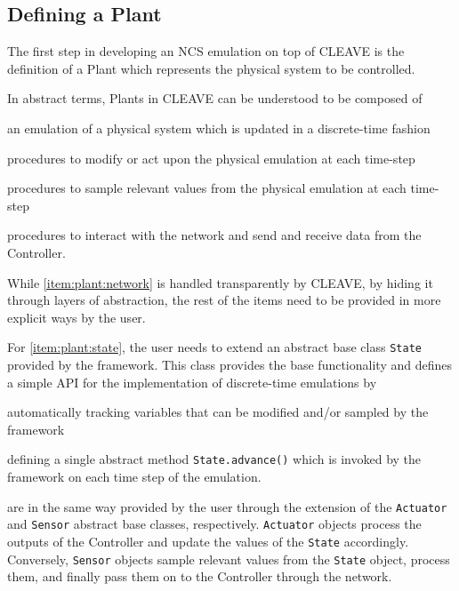 \subsection{Defining a Plant}

The first step in developing an \ac{NCS} emulation on top of \ac{CLEAVE} is the definition of a Plant which represents the physical system to be controlled.

In abstract terms, Plants in \ac{CLEAVE} can be understood to be composed of
\begin{enumerate*}[itemjoin={{; }}, itemjoin*={{; and }}]
    \item\label{item:plant:state} an emulation of a physical system which is updated in a discrete-time fashion
    \item\label{item:plant:actuators} procedures to modify or act upon the physical emulation at each time-step
    \item\label{item:plant:sensors} procedures to sample relevant values from the physical emulation at each time-step
    \item\label{item:plant:network} procedures to interact with the network and send and receive data from the Controller.
\end{enumerate*}

While \cref{item:plant:network} is handled transparently by CLEAVE, by hiding it through layers of abstraction, the rest of the items need to be provided in more explicit ways by the user.

For \cref{item:plant:state}, the user needs to extend an abstract base class \texttt{State} provided by the framework.
This class provides the base functionality and defines a simple API for the implementation of discrete-time emulations by
\begin{enumerate*}[itemjoin={{; }}, itemjoin*={{; and }}]
    \item automatically tracking variables that can be modified and/or sampled by the framework
    \item defining a single abstract method \texttt{State.advance()} which is invoked by the framework on each time step of the emulation.
\end{enumerate*}

 are in the same way provided by the user through the extension of the \texttt{Actuator} and \texttt{Sensor} abstract base classes, respectively.
\texttt{Actuator} objects process the outputs of the Controller and update the values of the \texttt{State} accordingly.
Conversely, \texttt{Sensor} objects sample relevant values from the \texttt{State} object, process them, and finally pass them on to the Controller through the network.

